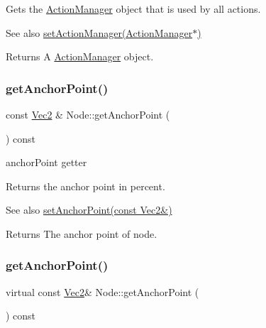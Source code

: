 Gets the \hyperlink{classActionManager}{Action\+Manager} object that is used by all actions. \begin{DoxySeeAlso}{See also}
\hyperlink{classNode_a2807ac202214bee721a75c098da54bc6}{set\+Action\+Manager(\+Action\+Manager$\ast$)} 
\end{DoxySeeAlso}
\begin{DoxyReturn}{Returns}
A \hyperlink{classActionManager}{Action\+Manager} object. 
\end{DoxyReturn}
\mbox{\label{classNode_a391027410f7f45889938090feb631cba}} 
\subsubsection{\texorpdfstring{get\+Anchor\+Point()}{getAnchorPoint()}\hspace{0.1cm}{\footnotesize\ttfamily [1/2]}}
{\footnotesize\ttfamily const \hyperlink{classVec2}{Vec2} \& Node\+::get\+Anchor\+Point (\begin{DoxyParamCaption}{ }\end{DoxyParamCaption}) const\hspace{0.3cm}{\ttfamily [virtual]}}



anchor\+Point getter 

Returns the anchor point in percent.

\begin{DoxySeeAlso}{See also}
{\ttfamily \hyperlink{classNode_a4dd45cb48a51df7c257675f527e3f277}{set\+Anchor\+Point(const Vec2\&)}}
\end{DoxySeeAlso}
\begin{DoxyReturn}{Returns}
The anchor point of node. 
\end{DoxyReturn}
\mbox{\label{classNode_a38378d77548a5c7bab5370f05882bb2f}} 
\subsubsection{\texorpdfstring{get\+Anchor\+Point()}{getAnchorPoint()}\hspace{0.1cm}{\footnotesize\ttfamily [2/2]}}
{\footnotesize\ttfamily virtual const \hyperlink{classVec2}{Vec2}\& Node\+::get\+Anchor\+Point (\begin{DoxyParamCaption}{ }\end{DoxyParamCaption}) const\hspace{0.3cm}{\ttfamily [virtual]}}

